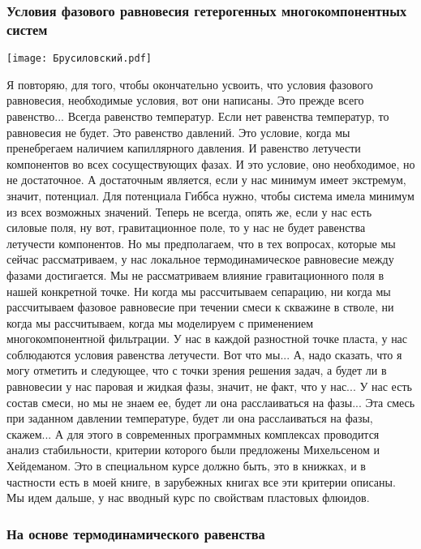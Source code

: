 \documentclass[main.tex]{subfiles}
\begin{document}
\subsubsection{Условия фазового равновесия гетерогенных многокомпонентных систем}

\begin{center}
\texttt{[image: Брусиловский.pdf]}
\end{center}

Я повторяю, для того, чтобы окончательно усвоить, что условия фазового равновесия, необходимые условия, вот они написаны.
Это прежде всего равенство... Всегда равенство температур.
Если нет равенства температур, то равновесия не будет.
Это равенство давлений.
Это условие, когда мы пренебрегаем наличием капиллярного давления.
И равенство летучести компонентов во всех сосуществующих фазах.
И это условие, оно необходимое, но не достаточное.
А достаточным является, если у нас минимум имеет экстремум, значит, потенциал.
Для потенциала Гиббса нужно, чтобы система имела минимум из всех возможных значений.
Теперь не всегда, опять же, если у нас есть силовые поля, ну вот, гравитационное поле, то у нас не будет равенства летучести компонентов.
Но мы предполагаем, что в тех вопросах, которые мы сейчас рассматриваем, у нас локальное термодинамическое равновесие между фазами достигается.
Мы не рассматриваем влияние гравитационного поля в нашей конкретной точке.
Ни когда мы рассчитываем сепарацию, ни когда мы рассчитываем фазовое равновесие при течении смеси к скважине в стволе, ни когда мы рассчитываем, когда мы моделируем с применением многокомпонентной фильтрации.
У нас в каждой разностной точке пласта, у нас соблюдаются условия равенства летучести.
Вот что мы...
А, надо сказать, что я могу отметить и следующее, что с точки зрения решения задач, а будет ли в равновесии у нас паровая и жидкая фазы, значит, не факт, что у нас...
У нас есть состав смеси, но мы не знаем ее, будет ли она расслаиваться на фазы...
Эта смесь при заданном давлении температуре, будет ли она расслаиваться на фазы, скажем...
А для этого в современных программных комплексах проводится анализ стабильности, критерии которого были предложены Михельсеном и Хейдеманом.
Это в специальном курсе должно быть, это в книжках, и в частности есть в моей книге, в зарубежных книгах все эти критерии описаны.
Мы идем дальше, у нас вводный курс по свойствам пластовых флюидов.

\subsubsection{На основе термодинамического равенства}
\end{document}
